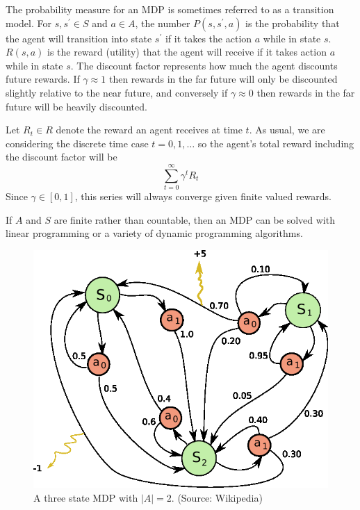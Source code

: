 \documentclass[tog]{acmsiggraph}
\begin{document}
The probability measure for an MDP is sometimes referred to as a transition
 model. For $s, s^\prime \in S $ and $a \in A$, the number $P \left(s, s^\prime , a \right)$
 is the probability that the agent will transition into state $s^\prime$ 
if it takes the action $a$ while in state $s$. $R \left( s, a \right)$ is 
the reward (utility) that the agent will receive if it takes action $a$ while 
in state $s$. The discount factor represents how much the agent discounts 
future rewards. If $\gamma \approx 1$ then rewards in the far future will 
only be discounted slightly relative to the near future, and conversely if 
$\gamma \approx 0$ then rewards in the far future will be heavily discounted.

Let $R_t \in R$ denote the reward an agent receives at time $t$. As usual, 
we are considering the discrete time case $t = 0, 1, \ldots$ so the agent's 
total reward including the discount factor will be
\begin{equation*}
  \sum_{t=0}^\infty \gamma^t R_t
\end{equation*}
Since $\gamma \in \left[0, 1 \right]$, this series will always converge given 
finite valued rewards.

If $A$ and $S$ are finite rather than countable, then an MDP can be solved with 
linear programming or a variety of dynamic programming algorithms.

\begin{figure}[h]
  \centering
  \def\svgwidth{\columnwidth}
  \includegraphics[width=\columnwidth]{MDP.png}
  \caption{A three state MDP with $\left| A \right| =2$. (Source: Wikipedia)}
  \label{fig:markovDecisionProcess}
\end{figure}
\end{document}
